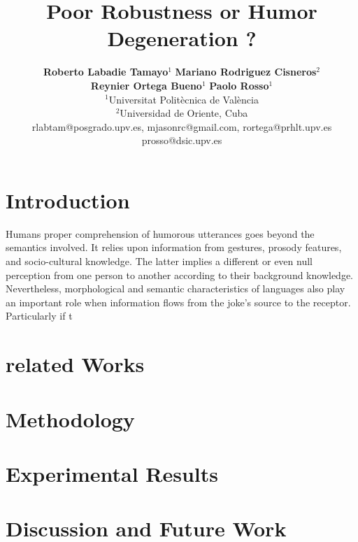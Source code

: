 \documentclass[a4paper,11pt,twocolumn,twoside]{article}
\title{Poor Robustness or Humor Degeneration ?}
\author {\textbf{Roberto Labadie Tamayo$^1$} \textbf{Mariano Rodriguez Cisneros$^2$} \\
 \textbf{Reynier Ortega  Bueno$^1$}  \textbf{Paolo Rosso$^1$}\\
$^1$Universitat Politècnica de València\\
$^2$Universidad de Oriente, Cuba\\
rlabtam@posgrado.upv.es, mjasonrc@gmail.com, rortega@prhlt.upv.es\\
prosso@dsic.upv.es\\
}
\begin{document}



\label{firstpage} \maketitle


\section{Introduction}

Humans proper comprehension of humorous utterances  goes beyond the semantics involved. It relies upon information from gestures, prosody features, and socio-cultural knowledge. The latter implies a different or even null perception from one person to another according to their background knowledge. Nevertheless, morphological and semantic characteristics of languages also play an important role when information flows from the joke's source to the receptor. Particularly if t

\section{related Works}

\section{Methodology}

\section{Experimental Results}

\section{Discussion and Future Work}



\end{document}
